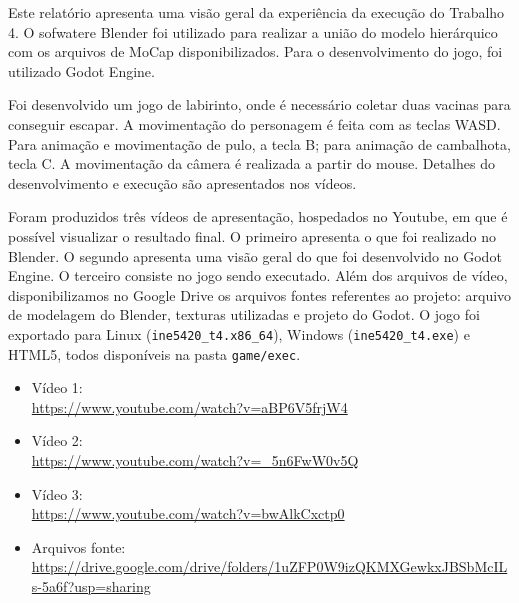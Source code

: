 Este relatório apresenta uma visão geral da experiência da execução do Trabalho 4. O sofwatere Blender foi utilizado para realizar a união do modelo hierárquico com os arquivos de MoCap disponibilizados. Para o desenvolvimento do jogo, foi utilizado Godot Engine.

Foi desenvolvido um jogo de labirinto, onde é necessário coletar duas vacinas para conseguir escapar. A movimentação do personagem é feita com as teclas WASD. Para animação e movimentação de pulo, a tecla B; para animação de cambalhota, tecla C. A movimentação da câmera é realizada a partir do mouse. Detalhes do desenvolvimento e execução são apresentados nos vídeos.

Foram produzidos três vídeos de apresentação, hospedados no Youtube, em que é possível visualizar o resultado final. O primeiro apresenta o que foi realizado no Blender. O segundo apresenta uma visão geral do que foi desenvolvido no Godot Engine. O terceiro consiste no jogo sendo executado. Além dos arquivos de vídeo, disponibilizamos no Google Drive os arquivos fontes referentes ao projeto: arquivo de modelagem do Blender, texturas utilizadas e projeto do Godot. O jogo foi exportado para Linux (\texttt{ine5420\_t4.x86\_64}), Windows (\texttt{ine5420\_t4.exe}) e HTML5, todos disponíveis na pasta \texttt{game/exec}.

\begin{itemize}
    \item Vídeo 1: \\
    \url{https://www.youtube.com/watch?v=aBP6V5frjW4}
    \item Vídeo 2: \\
    \url{https://www.youtube.com/watch?v=_5n6FwW0v5Q}
    \item Vídeo 3: \\
    \url{https://www.youtube.com/watch?v=bwAlkCxctp0}
    \item Arquivos fonte: \\
    \url{https://drive.google.com/drive/folders/1uZFP0W9izQKMXGewkxJBSbMcILs-5a6f?usp=sharing}
\end{itemize}

